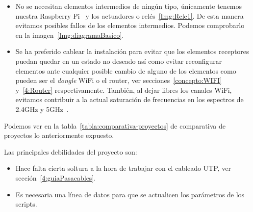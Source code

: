 \begin{itemize}
\item
    No se necesitan elementos intermedios de ningún tipo, únicamente tenemos nuestra Raspberry Pi~\cite{misc:RbPWeb} y los actuadores o relés~\ref{Img:Rele1}. De esta manera evitamos posibles fallos de los elementos intermedios. Podemos comprobarlo en la imagen~\ref{Img:diagramaBasico}.

    
\item
    Se ha preferido cablear la instalación para evitar que los elementos receptores puedan quedar en un estado no deseado así como evitar reconfigurar elementos ante cualquier posible cambio de alguno de los elementos como pueden ser el \textit{dongle} WiFi o el router, ver secciones~\ref{concepto:WIFI} y~\ref{4:Router} respectivamente.
    También, al dejar libres los canales WiFi, evitamos contribuir a la actual saturación de frecuencias en los espectros de 2.4GHz y 5GHz~\cite{manual:IEEE802.11}.

\end{itemize}


Podemos ver en la tabla~\ref{tabla:comparativa-proyectos} de comparativa de proyectos lo anteriormente expuesto.



Las principales debilidades del proyecto son:

\begin{itemize}
\tightlist
\item
    Hace falta cierta soltura a la hora de trabajar con el cableado UTP, ver sección~\ref{4:guiaPasacables}.
\item
    Es necesaria una línea de datos para que se actualicen los parámetros de los scripts.

\end{itemize}
